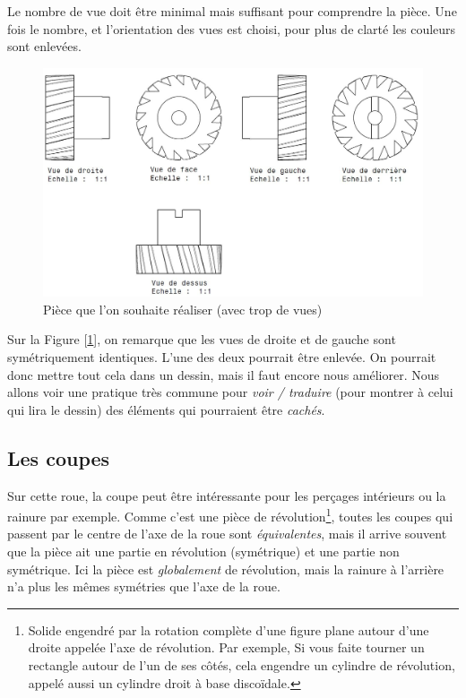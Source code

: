 \documentclass[
	11pt, %
	fleqn, %
	a4paper, %
]{LegrandOrangeBook}
\begin{document}
Le nombre de vue doit être minimal mais suffisant pour comprendre la pièce. Une fois le nombre, et l'orientation des vues est choisi, pour plus de clarté les couleurs sont enlevées.

\begin{figure}[H] %
	\centering %
	\includegraphics[width=1\textwidth]{Images/roue2.JPG} %
	\caption{Pièce que l'on souhaite réaliser (avec trop de vues)}
	\label{Roue3} %
\end{figure}

Sur la Figure [\ref{Roue3}], on remarque que les vues de droite et de gauche sont symétriquement identiques. L'une des deux pourrait être enlevée. On pourrait donc mettre tout cela dans un dessin, mais il faut encore nous améliorer. Nous allons voir une pratique très commune pour \textit{voir / traduire} (pour montrer à celui qui lira le dessin) des éléments qui pourraient être \textit{cachés}.

\subsection{Les coupes}

Sur cette roue, la coupe peut être intéressante pour les perçages intérieurs ou la rainure par exemple. Comme c'est une pièce de révolution\footnote{Solide engendré par la rotation complète d’une figure plane autour d’une droite appelée l’axe de révolution. Par exemple, Si vous faite tourner un rectangle autour de l’un de ses côtés, cela engendre un cylindre de révolution, appelé aussi un cylindre droit à base discoïdale.}, toutes les coupes qui passent par le centre de l'axe de la roue sont \textit{équivalentes}, mais il arrive souvent que la pièce ait une partie en révolution (symétrique) et une partie non symétrique. Ici la pièce est \textit{globalement} de révolution, mais la rainure à l'arrière n'a plus les mêmes symétries que l'axe de la roue.
\end{document}
